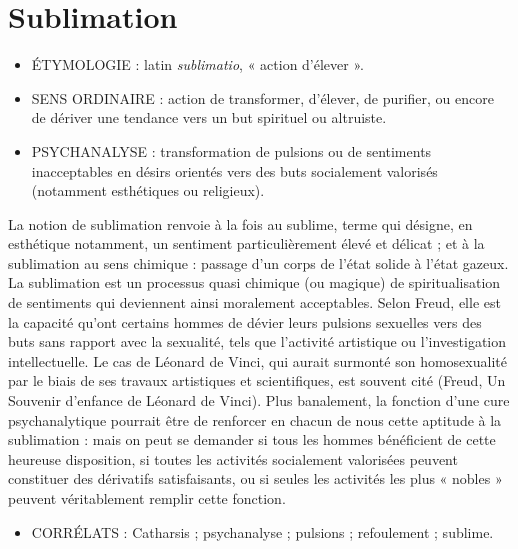 
\chapter{Sublimation}

\begin{itemize}[leftmargin=1cm, label=, itemsep=1pt]
\item {\footnotesize ÉTYMOLOGIE} : latin {\it sublimatio},
« action d'élever ».
\item {\footnotesize SENS ORDINAIRE} : action de transformer, d'élever,
de purifier, ou encore de dériver
une tendance vers un but spirituel
ou  altruiste.
\item {\footnotesize PSYCHANALYSE} : 
transformation de pulsions ou de
sentiments inacceptables en désirs
orientés vers des buts socialement
valorisés (notamment esthétiques
ou religieux).
\end{itemize}

La notion de sublimation renvoie à la
fois au sublime, terme qui désigne, en
esthétique notamment, un sentiment
particulièrement élevé et délicat ; et à la
sublimation au sens chimique : passage
d'un corps de l'état solide à l'état
gazeux. La sublimation est un processus
quasi chimique (ou magique) de spiritualisation de sentiments qui
deviennent ainsi moralement acceptables. Selon Freud, elle est la capacité
qu'ont certains hommes de dévier leurs
pulsions sexuelles vers des buts sans
rapport avec la sexualité, tels que l’activité artistique ou l’investigation intellectuelle. Le cas de Léonard de Vinci, qui
aurait surmonté son homosexualité par
le biais de ses travaux artistiques et
scientifiques, est souvent cité (Freud, Un
Souvenir d'enfance de Léonard de
Vinci). Plus banalement, la fonction
d'une cure psychanalytique pourrait être
de renforcer en chacun de nous cette
aptitude à la sublimation : mais on peut
se demander si tous les hommes bénéficient de cette heureuse disposition, si
toutes les activités socialement valorisées peuvent constituer des dérivatifs
satisfaisants, ou si seules les activités les
plus « nobles » peuvent véritablement
remplir cette fonction.


\begin{itemize}[leftmargin=1cm, label=, itemsep=1pt]
\item {\footnotesize CORRÉLATS} : Catharsis ; psychanalyse ; pulsions ; refoulement ; sublime.
\end{itemize}

